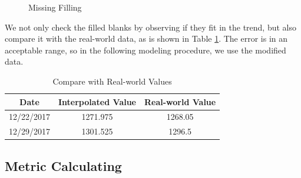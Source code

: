 \documentclass[12pt,a4paper]{article}
\begin{document}
\begin{spacing}{1.2}
\begin{figure}
	\begin{center}
		\caption{Missing Filling}
		\label{fig:fill_missing}
	\end{center}
\end{figure}

We not only check the filled blanks by observing if they fit in the trend, but also compare it with the real-world data, as is shown in Table \ref{table:fill_comp}. The error is in an acceptable range, so in the following modeling procedure, we use the modified data.

\begin{table}[H]
	\renewcommand{\arraystretch}{1.5}
	\caption{Compare with Real-world Values}
	\label{table:fill_comp}
	\begin{center}
		{\footnotesize
			\begin{tabular}{c|c c }
				\toprule
				Date & Interpolated Value & Real-world Value\\
				\midrule
				12/22/2017 & 1271.975 & 1268.05 \\
				12/29/2017 & 1301.525 & 1296.5 \\
				\bottomrule
		\end{tabular}}
	\end{center}	
\end{table}


\subsection{Metric Calculating}


\end{spacing}
\end{document}
